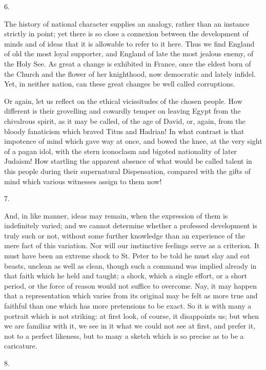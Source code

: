6.

The history of national character supplies an analogy,
rather than an instance strictly in point; yet there is
so close a connexion between the development of minds and
of ideas that it is allowable to refer to it here. Thus
we find England of old the most loyal supporter, and
England of late the most jealous enemy, of the Holy See.
As great a change is exhibited in France, once the eldest
born of the Church and the flower of her knighthood, now
democratic and lately infidel. Yet, in neither nation,
can these great changes be well called corruptions.

Or again, let us reflect on the ethical vicissitudes
of the chosen people. How different is their grovelling
and cowardly temper on leaving Egypt from the chivalrous
spirit, as it may be called, of the age of David, or,
again, from the bloody fanaticism which braved Titus and
Hadrian! In what contrast is that impotence of mind which
gave way at once, and bowed the knee, at the very sight
of a pagan idol, with the stern iconoclasm and bigoted
nationality of later Judaism! How startling the apparent
absence of what would be called talent in this people
during their supernatural Dispensation, compared with the
gifts of mind which various witnesses assign to them now!

7.

And, in like manner, ideas may remain, when the
expression of them is indefinitely varied; and we cannot
determine whether a professed development is truly such
or not, without some further knowledge than an experience
of the mere fact of this variation. Nor will our
instinctive feelings serve as a criterion. It must have
been an extreme shock to St. Peter to be told he must
slay and eat beasts, unclean as well as clean, though
such a command was implied already in that faith which he
held and taught; a shock, which a single effort, or a
short period, or the force of reason would not suffice to
overcome. Nay, it may happen that a representation which
varies from its original may be felt as more true and
faithful than one which has more pretensions to be exact.
So it is with many a portrait which is not striking: at
first look, of course, it disappoints us; but when we are
familiar with it, we see in it what we could not see at
first, and prefer it, not to a perfect likeness, but to
many a sketch which is so precise as to be a caricature.

8.


